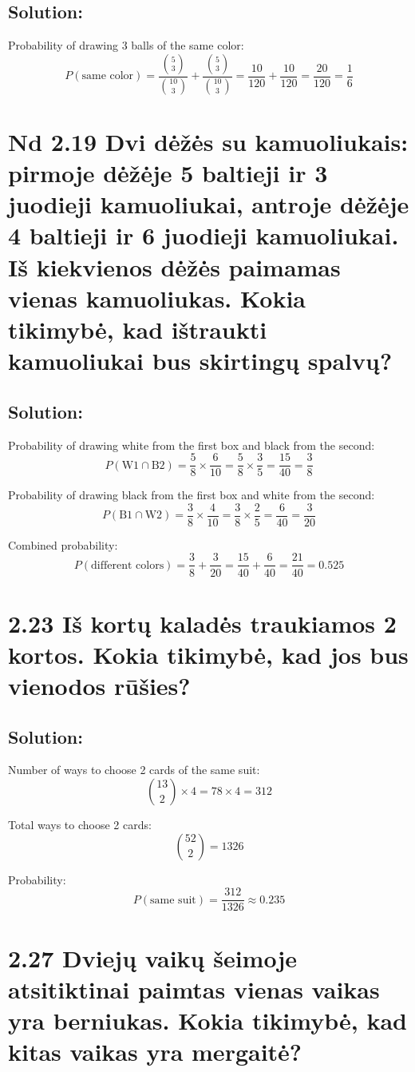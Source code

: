 \documentclass{article}
\begin{document}
{\subsection*{Solution:}
Probability of drawing 3 balls of the same color:
\[
P(\text{same color}) = \frac{\binom{5}{3}}{\binom{10}{3}} + \frac{\binom{5}{3}}{\binom{10}{3}} = \frac{10}{120} + \frac{10}{120} = \frac{20}{120} = \frac{1}{6}
\]

\section*{Nd 2.19 Dvi dėžės su kamuoliukais: pirmoje dėžėje 5 baltieji ir 3 juodieji kamuoliukai, antroje dėžėje 4 baltieji ir 6 juodieji kamuoliukai. Iš kiekvienos dėžės paimamas vienas kamuoliukas. Kokia tikimybė, kad ištraukti kamuoliukai bus skirtingų spalvų?}
\subsection*{Solution:}
Probability of drawing white from the first box and black from the second:
\[
P(\text{W1} \cap \text{B2}) = \frac{5}{8} \times \frac{6}{10} = \frac{5}{8} \times \frac{3}{5} = \frac{15}{40} = \frac{3}{8}
\]

Probability of drawing black from the first box and white from the second:
\[
P(\text{B1} \cap \text{W2}) = \frac{3}{8} \times \frac{4}{10} = \frac{3}{8} \times \frac{2}{5} = \frac{6}{40} = \frac{3}{20}
\]

Combined probability:
\[
P(\text{different colors}) = \frac{3}{8} + \frac{3}{20} = \frac{15}{40} + \frac{6}{40} = \frac{21}{40} = 0.525
\]

\section*{2.23 Iš kortų kaladės traukiamos 2 kortos. Kokia tikimybė, kad jos bus vienodos rūšies?}
\subsection*{Solution:}
Number of ways to choose 2 cards of the same suit:
\[
\binom{13}{2} \times 4 = 78 \times 4 = 312
\]

Total ways to choose 2 cards:
\[
\binom{52}{2} = 1326
\]

Probability:
\[
P(\text{same suit}) = \frac{312}{1326} \approx 0.235
\]

\section*{2.27 Dviejų vaikų šeimoje atsitiktinai paimtas vienas vaikas yra berniukas. Kokia tikimybė, kad kitas vaikas yra mergaitė?}
}
\end{document}
